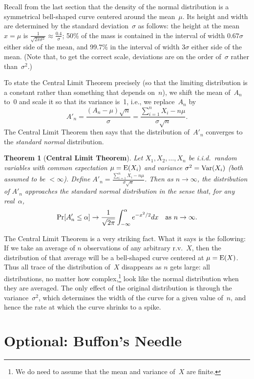\documentclass[11pt]{article}
\def\Ex#1{{\rm E}(#1)}
\def\Var#1{{\rm Var}(#1)}
\newcounter{thm}
\newtheorem{theorem}{Theorem}[thm]
\begin{document}
Recall from the last section that the density of the normal distribution
is a symmetrical bell-shaped curve centered around the mean~$\mu$.
Its height and width are determined by the standard
deviation~$\sigma$ as follows: the height at the mean $x = \mu$ is $\frac{1}{\sqrt{2\pi \sigma^2}} \approx \frac{0.4}{\sigma}$; 
50\% of the mass is contained in the interval of
width $0.67\sigma$ either side of the mean, and 99.7\% in the
interval of width $3\sigma$ either side of the mean. (Note that, to
get the correct scale, deviations are on the order of~$\sigma$
rather than~$\sigma^2$.)

To state the Central Limit Theorem precisely (so that the limiting
distribution is a constant rather than something that depends
on~$n$), we shift the mean of~$A_n$ to~0 and scale it so that its
variance is~1, i.e., we replace~$A_n$ by $$
   A'_n = \frac{(A_n-\mu)\sqrt{n}}{\sigma} = \frac{\sum_{i=1}^n X_i -n\mu}{\sigma\sqrt{n}}.  $$
The Central Limit Theorem then says that the distribution of~$A'_n$
converges to the {\it standard normal\/} distribution.

\begin{theorem}[{\bf Central Limit Theorem}]
Let $X_1,X_2,\ldots,X_n$ be i.i.d.\ random variables with common
expectation $\mu=\Ex{X_i}$ and variance $\sigma^2=\Var{X_i}$ (both
assumed to be $<\infty$).  Define $A'_n = \frac{\sum_{i=1}^n X_i
-n\mu}{\sigma\sqrt{n}}$. Then as $n\to\infty$, the distribution of
$A'_n$ approaches the standard normal distribution in the sense
that, for any real~$\alpha$, $$
   \Pr[A'_n \le \alpha] \to \frac{1}{\sqrt{2\pi}}\int_{-\infty}^\alpha e^{-x^2/2}dx\quad\hbox{\rm as $n\to\infty$}.  $$
\end{theorem}

The Central Limit Theorem is a very striking fact.  What it says is
the following:  If we take an average of $n$ observations of
 any arbitrary r.v.~$X$, then the distribution of that average will
be a bell-shaped curve centered at $\mu=\Ex{X}$.  Thus all trace of
the distribution of~$X$ disappears as $n$ gets large: all
distributions, no matter how complex,\footnote{We do need to assume
that the mean and variance of~$X$ are finite.} look like the normal
distribution when they are averaged.  The only effect of the
original distribution is through the variance~$\sigma^2$, which
determines the width of the curve for a given value of~$n$, and
hence the rate at which the curve shrinks to a spike.


\section*{Optional: Buffon's Needle}
\end{document}
